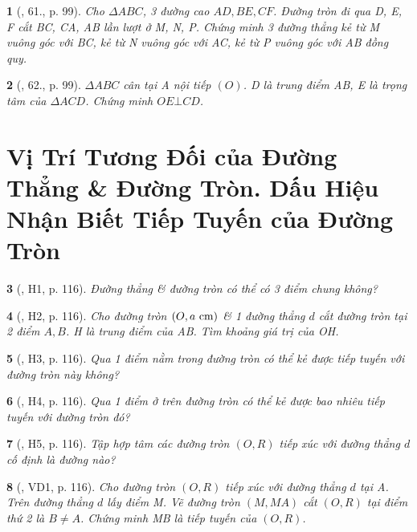 \documentclass{article}
\newtheorem{baitoan}{}
\begin{document}
\begin{baitoan}[\cite{Binh_Toan_9_tap_1}, 61., p. 99]
	Cho $\Delta ABC$, 3 đường cao $AD,BE,CF$. Đường tròn đi qua D, E, F cắt BC, CA, AB lần lượt ở M, N, P. Chứng minh 3 đường thẳng kẻ từ M vuông góc với BC, kẻ từ N vuông góc với AC, kẻ từ P vuông góc với AB đồng quy.
\end{baitoan}

\begin{baitoan}[\cite{Binh_Toan_9_tap_1}, 62., p. 99]
	$\Delta ABC$ cân tại A nội tiếp $(O)$. D là trung điểm AB, E là trọng tâm của $\Delta ACD$. Chứng minh $OE\bot CD$.
\end{baitoan}


\section{Vị Trí Tương Đối của Đường Thẳng \& Đường Tròn. Dấu Hiệu Nhận Biết Tiếp Tuyến của Đường Tròn}

\begin{baitoan}[\cite{Binh_boi_duong_Toan_9_tap_1}, H1, p. 116]
	Đường thẳng \& đường tròn có thể có 3 điểm chung không?
\end{baitoan}

\begin{baitoan}[\cite{Binh_boi_duong_Toan_9_tap_1}, H2, p. 116]
	Cho đường tròn $(O,a\ {\rm cm})$ \& 1 đường thẳng $d$ cắt đường tròn tại 2 điểm $A,B$. H là trung điểm của AB. Tìm khoảng giá trị của OH.
\end{baitoan}

\begin{baitoan}[\cite{Binh_boi_duong_Toan_9_tap_1}, H3, p. 116]
	Qua 1 điểm nằm trong đường tròn có thể kẻ được tiếp tuyến với đường tròn này không?
\end{baitoan}

\begin{baitoan}[\cite{Binh_boi_duong_Toan_9_tap_1}, H4, p. 116]
	Qua 1 điểm ở trên đường tròn có thể kẻ được bao nhiêu tiếp tuyến với đường tròn đó?
\end{baitoan}

\begin{baitoan}[\cite{Binh_boi_duong_Toan_9_tap_1}, H5, p. 116]
	Tập hợp tâm các đường tròn $(O,R)$ tiếp xúc với đường thẳng $d$ cố định là đường nào?
\end{baitoan}

\begin{baitoan}[\cite{Binh_boi_duong_Toan_9_tap_1}, VD1, p. 116]
	Cho đường tròn $(O,R)$ tiếp xúc với đường thẳng $d$ tại A. Trên đường thẳng $d$ lấy điểm M. Vẽ đường tròn $(M,MA)$ cắt $(O,R)$ tại điểm thứ 2 là $B\ne A$. Chứng minh MB là tiếp tuyến của $(O,R)$.
\end{baitoan}
\end{document}
